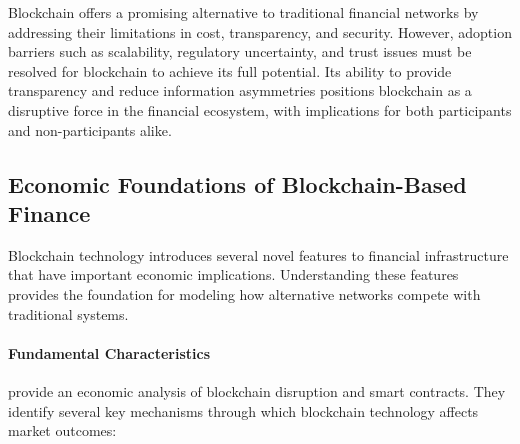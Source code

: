 Blockchain offers a promising alternative to traditional financial networks by addressing their limitations in cost, transparency, and security. However, adoption barriers such as scalability, regulatory uncertainty, and trust issues must be resolved for blockchain to achieve its full potential. Its ability to provide transparency and reduce information asymmetries positions blockchain as a disruptive force in the financial ecosystem, with implications for both participants and non-participants alike.


\subsection{Economic Foundations of Blockchain-Based Finance}

Blockchain technology introduces several novel features to financial infrastructure that have important economic implications. Understanding these features provides the foundation for modeling how alternative networks compete with traditional systems.

\paragraph{Fundamental Characteristics}

 provide an economic analysis of blockchain disruption and smart contracts. They identify several key mechanisms through which blockchain technology affects market outcomes:

